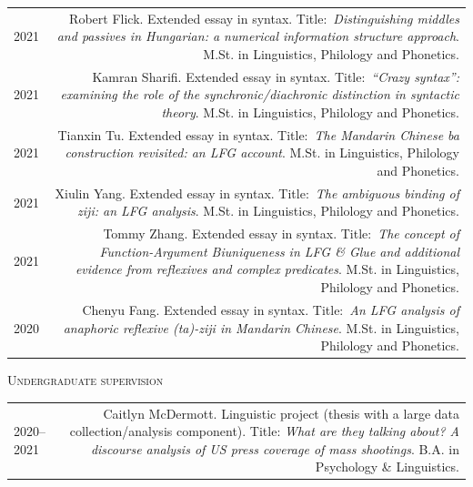 \documentclass[11pt,a4paper]{article}
\makeatletter
\newlength{\rulelength}%
\newenvironment{cvsection}{%
  \setlength{\extrarowheight}{0.70ex}
  \begin{longtable}[l]{@{} L R @{}}
}{%
  \end{longtable}
}
\newcommand{\cvheading}[1]{\noindent{{\color{headercolor}\rule[0.4ex]{\rulelength}{2pt}\hspace*{9pt} \Large #1}}\vspace*{0.5\baselineskip}}
\newcommand{\cvsubhead}[1]{\noindent\hspace*{\rulelength}\hspace*{9pt} \textsc{#1}\vspace*{0.25\baselineskip}}
\makeatother
\begin{document}
\begin{cvsection}
  2021 & Robert Flick. Extended essay in syntax. Title:~\textit{Distinguishing
    middles and passives in Hungarian: a numerical information structure
    approach}. M.St. in Linguistics, Philology and Phonetics. \\

  2021 & Kamran Sharifi. Extended essay in syntax. Title:~\textit{``Crazy
    syntax'': examining the role of the synchronic/diachronic distinction in
    syntactic theory}. M.St. in Linguistics, Philology and Phonetics.\\

  2021 & Tianxin Tu. Extended essay in syntax. Title:~\textit{The Mandarin
    Chinese \emph{ba} construction revisited: an LFG account}. M.St. in Linguistics, Philology and Phonetics.\\

  2021 & Xiulin Yang. Extended essay in syntax. Title:~\textit{The ambiguous
    binding of \emph{ziji}: an LFG analysis}. M.St. in Linguistics, Philology and Phonetics.\\

  2021 & Tommy Zhang. Extended essay in syntax. Title:~\textit{The concept of
    Function-Argument Biuniqueness in LFG \& Glue and additional evidence
    from reflexives and complex predicates}. M.St. in Linguistics, Philology and Phonetics.\\

  2020 & Chenyu Fang. Extended essay in syntax. Title:~\textit{An LFG analysis
    of anaphoric reflexive \emph{(ta)-ziji} in Mandarin Chinese}. M.St. in
  Linguistics, Philology and Phonetics.
\end{cvsection}

\cvsubhead{Undergraduate supervision}

\begin{cvsection}
  2020--2021 & Caitlyn McDermott. Linguistic project (thesis with a large data
  collection\slash analysis component). Title: \textit{What are they talking about? A discourse analysis of US press coverage of mass shootings}. B.A. in Psychology \& Linguistics.\\
\end{cvsection}



\end{document}
